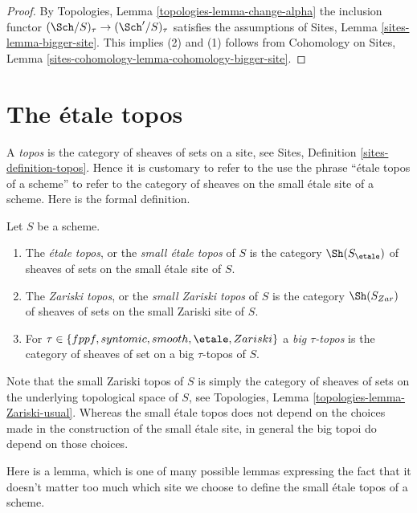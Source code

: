 \begin{proof}
By Topologies, Lemma \ref{topologies-lemma-change-alpha} the inclusion functor
$(\Sch/S)_\tau \to (\Sch'/S)_\tau$ satisfies the assumptions of
Sites, Lemma \ref{sites-lemma-bigger-site}. This implies (2) and (1)
follows from
Cohomology on Sites, Lemma \ref{sites-cohomology-lemma-cohomology-bigger-site}.
\end{proof}




\section{The \'etale topos}
\label{section-etale-topos}

\noindent
A {\it topos} is the category of sheaves of sets on a site, see
Sites, Definition \ref{sites-definition-topos}. Hence it is customary
to refer to the use the phrase ``\'etale topos of a scheme'' to refer to
the category of sheaves on the small \'etale site of a scheme.
Here is the formal definition.

\begin{definition}
\label{definition-etale-topos}
Let $S$ be a scheme.
\begin{enumerate}
\item The {\it \'etale topos}, or the {\it small \'etale topos}
of $S$ is the category $\Sh(S_\etale)$ of sheaves of sets on
the small \'etale site of $S$.
\item The {\it Zariski topos}, or the {\it small Zariski topos}
of $S$ is the category $\Sh(S_{Zar})$ of sheaves of sets on the
small Zariski site of $S$.
\item For $\tau \in \{fppf, syntomic, smooth, \etale, Zariski\}$ a
{\it big $\tau$-topos} is the category of sheaves of set on a
big $\tau$-topos of $S$.
\end{enumerate}
\end{definition}

\noindent
Note that the small Zariski topos of $S$ is simply the category of sheaves
of sets on the underlying topological space of $S$, see
Topologies, Lemma \ref{topologies-lemma-Zariski-usual}.
Whereas the small \'etale topos does not depend on the choices made in the
construction of the small \'etale site, in general the big topoi do depend
on those choices.

\medskip\noindent
Here is a lemma, which is one of many possible lemmas expressing the
fact that it doesn't matter too much which site we choose to define
the small \'etale topos of a scheme.

